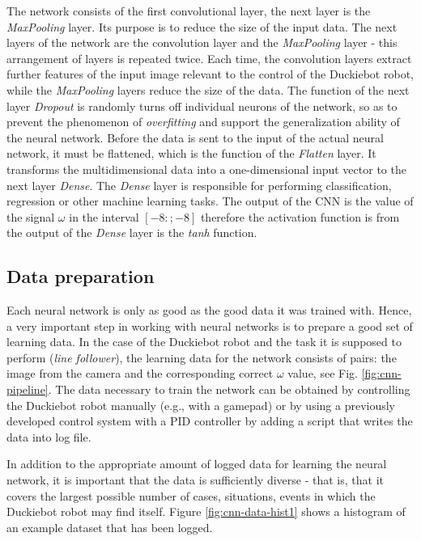\documentclass[conference]{IEEEtran}
\begin{document}
The network consists of the first convolutional layer, the next layer is the \emph{MaxPooling} layer. Its purpose is to reduce the size of the input data. The next layers of the network are the convolution layer and the \emph{MaxPooling} layer - this arrangement of layers is repeated twice. Each time, the convolution layers extract further features of the input image relevant to the control of the Duckiebot robot, while the \emph{MaxPooling} layers reduce the size of the data. The function of the next layer \emph{Dropout} is randomly turns off individual neurons of the network, so as to prevent the phenomenon of \emph{overfitting} and support the generalization ability of the neural network. Before the data is sent to the input of the actual neural network, it must be flattened, which is the function of the \emph{Flatten} layer. It transforms the multidimensional data into a one-dimensional input vector to the next layer \emph{Dense}. The \emph{Dense} layer is responsible for performing classification, regression or other machine learning tasks. The output of the CNN is the value of the signal $\omega$ in the interval $[-8: ; -8]$ therefore the activation function is from the output of the \emph{Dense} layer is the \emph{tanh} function.

\subsection{Data preparation}
Each neural network is only as good as the good data it was trained with. Hence, a very important step in working with neural networks is to prepare a good set of learning data. In the case of the Duckiebot robot and the task it is supposed to perform (\emph{line follower}), the learning data for the network consists of pairs: the image from the camera and the corresponding correct $\omega$ value, see Fig. \ref{fig:cnn-pipeline}. The data necessary to train the network can be obtained by controlling the Duckiebot robot manually (e.g., with a gamepad) or by using a previously developed control system with a PID controller by adding a script that writes the data into log file. 

In addition to the appropriate amount of logged data for learning the neural network, it is important that the data is sufficiently diverse - that is, that it covers the largest possible number of cases, situations, events in which the Duckiebot robot may find itself. Figure \ref{fig:cnn-data-hist1} shows a histogram of an example dataset that has been logged. 
\end{document}
